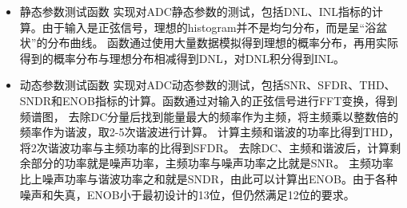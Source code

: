 \documentclass[cs4size,a4paper]{ctexart}
\numberwithin{equation}{section}
\numberwithin{table}{section}
\numberwithin{figure}{section}
\begin{document}
\begin{itemize}
		\item 静态参数测试函数
		实现对ADC静态参数的测试，包括DNL、INL指标的计算。由于输入是正弦信号，理想的histogram并不是均匀分布，而是呈“浴盆状”的分布曲线。
		函数通过使用大量数据模拟得到理想的概率分布，再用实际得到的概率分布与理想分布相减得到DNL，对DNL积分得到INL。

		\item 动态参数测试函数
		实现对ADC动态参数的测试，包括SNR、SFDR、THD、SNDR和ENOB指标的计算。函数通过对输入的正弦信号进行FFT变换，得到频谱图，
		去除DC分量后找到能量最大的频率作为主频，将主频乘以整数倍的频率作为谐波，取2-5次谐波进行计算。
		计算主频和谐波的功率比得到THD，将2次谐波功率与主频功率的比得到SFDR。
		去除DC、主频和谐波后，计算剩余部分的功率就是噪声功率，主频功率与噪声功率之比就是SNR。
		主频功率比上噪声功率与谐波功率之和就是SNDR，由此可以计算出ENOB。由于各种噪声和失真，ENOB小于最初设计的13位，但仍然满足12位的要求。

	\end{itemize}


		
% 
\clearpage
% 
%
\end{document}
